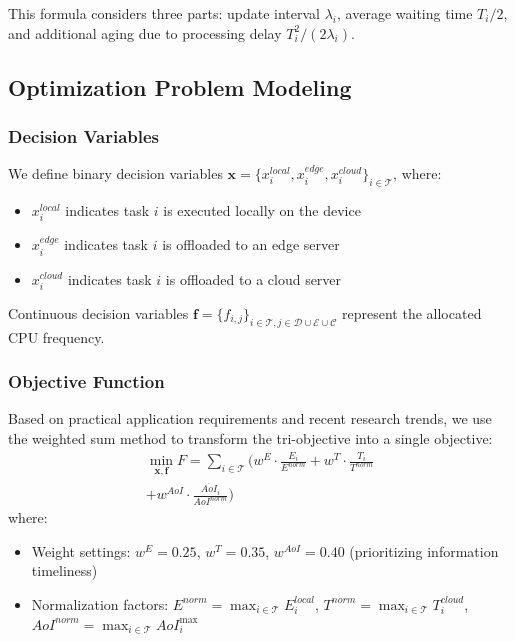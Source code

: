 \documentclass[conference]{IEEEtran}
\begin{document}
This formula considers three parts: update interval $\lambda_i$, average waiting time $T_i/2$, and additional aging due to processing delay $T_i^2/(2\lambda_i)$.

\subsection{Optimization Problem Modeling}

\subsubsection{Decision Variables}
We define binary decision variables $\mathbf{x} = \{x_i^{local}, x_i^{edge}, x_i^{cloud}\}_{i \in \mathcal{T}}$, where:
\begin{itemize}
    \item $x_{i}^{local}$ indicates task $i$ is executed locally on the device
    \item $x_{i}^{edge}$ indicates task $i$ is offloaded to an edge server
    \item $x_{i}^{cloud}$ indicates task $i$ is offloaded to a cloud server
\end{itemize}
Continuous decision variables $\mathbf{f} = \{f_{i,j}\}_{i \in \mathcal{T}, j \in \mathcal{D} \cup \mathcal{E} \cup \mathcal{C}}$ represent the allocated CPU frequency.

\subsubsection{Objective Function}
Based on practical application requirements and recent research trends, we use the weighted sum method to transform the tri-objective into a single objective:
\begin{equation}
    \begin{split}
        \min_{\mathbf{x}, \mathbf{f}} F = \sum_{i \in \mathcal{T}} \bigg( w^E \cdot \frac{E_i}{E^{norm}} + w^T \cdot \frac{T_i}{T^{norm}}
        \\+ w^{AoI} \cdot \frac{\overline{AoI}_i}{AoI^{norm}} \bigg)
    \end{split}
\end{equation}
where:
\begin{itemize}
    \item Weight settings: $w^E = 0.25$, $w^T = 0.35$, $w^{AoI} = 0.40$ (prioritizing information timeliness)
    \item Normalization factors: $E^{norm} = \max_{i \in \mathcal{T}} E_i^{local}$, $T^{norm} = \max_{i \in \mathcal{T}} T_i^{cloud}$, $AoI^{norm} = \max_{i \in \mathcal{T}} AoI_i^{\max}$
\end{itemize}
\end{document}
